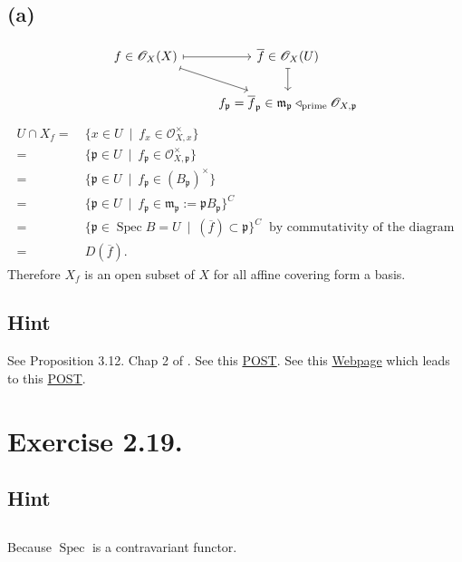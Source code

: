 \subsection{(a)}
\[\begin{tikzcd}
	{f\in\mathscr O_X(X)} & {\overline f\in\mathscr O_X(U)} \\
	& {f_\mathfrak p=\overline f_{\mathfrak p}\in\mathfrak m_{\mathfrak p}\triangleleft_{\text{prime}}\mathscr O_{X,\mathfrak p}}
	\arrow[maps to, from=1-1, to=1-2]
	\arrow[maps to, from=1-2, to=2-2]
	\arrow[maps to, from=1-1, to=2-2]
\end{tikzcd}\]
\begin{align*}
    U\cap X_f =&~ \{x\in U ~\mid~ f_x\in \mathscr O_{X,x}^{\times}\}\\
    =&~ \{\mathfrak p\in U ~\mid~ f_{\mathfrak p} \in \mathscr O_{X,\mathfrak p}^{\times}\}\\
    =&~ \{\mathfrak p\in U ~\mid~ f_{\mathfrak p}\in (B_{\mathfrak p})^{\times}\}\\
    =&~ \{\mathfrak p\in U ~\mid~ f_{\mathfrak p}\in \mathfrak m_{\mathfrak p}:=\mathfrak p B_{\mathfrak p}\}^C\\
    =&~ \{\mathfrak p\in \operatorname{Spec}B=U ~\mid~ (\overline f)\subset \mathfrak p\}^C ~\text{ by commutativity of the diagram}\\
    =&~ D(\overline f).
\end{align*}
Therefore $X_f$ is an open subset of $X$ for all affine covering form a basis. 

\subsection{Hint}


See Proposition 3.12. Chap 2 of \cite{qing2006algebraic}. See this \href{https://math.stackexchange.com/questions/2815859/hartshorne-algebraic-geometry-exercise-ii-2-16}{POST}. See this \href{https://math.berkeley.edu/~cjdowd/hartshorne.html}{Webpage} which leads to this \href{https://math.stackexchange.com/questions/57077/on-affine-local-properties}{POST}.

\section{Exercise 2.19.}

\subsection{Hint}



\subsection{}

Because $\operatorname{Spec}$ is a contravariant functor.